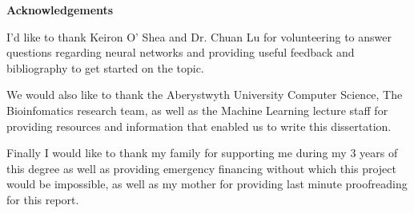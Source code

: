 \thispagestyle{empty}

\begin{center}
    {\LARGE\bf Acknowledgements}
\end{center}

I'd like to thank Keiron O' Shea and Dr. Chuan Lu for volunteering to answer questions regarding neural networks and providing useful feedback and bibliography to get started on the topic.

We would also like to thank the Aberystwyth University Computer Science, The Bioinfomatics research team, as well as the Machine Learning lecture staff for providing resources and information that enabled us to write this dissertation.

Finally I would like to thank my family for supporting me during my 3 years of this degree as well as providing emergency financing without which this project would be impossible, as well as my mother for providing last minute proofreading for this report.

